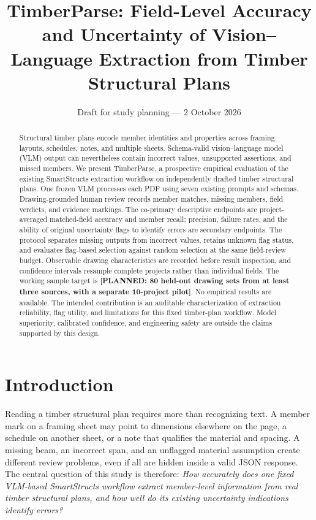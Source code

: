 \documentclass[11pt]{article}
\title{TimberParse: Field-Level Accuracy and Uncertainty of Vision--Language Extraction from Timber Structural Plans}
\author{\todo{Author names and affiliations}}
\date{Draft for study planning --- 2 October 2026}
\newcommand{\planned}[1]{\textcolor{blue!65!black}{\textbf{[PLANNED: #1]}}}
\begin{document}
\maketitle
\noindent{}

\begin{abstract}
Structural timber plans encode member identities and properties across framing layouts, schedules, notes, and multiple sheets. Schema-valid vision--language model (VLM) output can nevertheless contain incorrect values, unsupported assertions, and missed members. We present TimberParse, a prospective empirical evaluation of the existing SmartStructs extraction workflow on independently drafted timber structural plans. One frozen VLM processes each PDF using seven existing prompts and schemas. Drawing-grounded human review records member matches, missing members, field verdicts, and evidence markings. The co-primary descriptive endpoints are project-averaged matched-field accuracy and member recall; precision, failure rates, and the ability of original uncertainty flags to identify errors are secondary endpoints. The protocol separates missing outputs from incorrect values, retains unknown flag status, and evaluates flag-based selection against random selection at the same field-review budget. Observable drawing characteristics are recorded before result inspection, and confidence intervals resample complete projects rather than individual fields. The working sample target is \planned{80 held-out drawing sets from at least three sources, with a separate 10-project pilot}. No empirical results are available. The intended contribution is an auditable characterization of extraction reliability, flag utility, and limitations for this fixed timber-plan workflow. Model superiority, calibrated confidence, and engineering safety are outside the claims supported by this design.
\end{abstract}

\section{Introduction}
Reading a timber structural plan requires more than recognizing text. A member mark on a framing sheet may point to dimensions elsewhere on the page, a schedule on another sheet, or a note that qualifies the material and spacing. A missing beam, an incorrect span, and an unflagged material assumption create different review problems, even if all are hidden inside a valid JSON response. The central question of this study is therefore: \emph{How accurately does one fixed VLM-based SmartStructs workflow extract member-level information from real timber structural plans, and how well do its existing uncertainty indications identify errors?}
\end{document}
